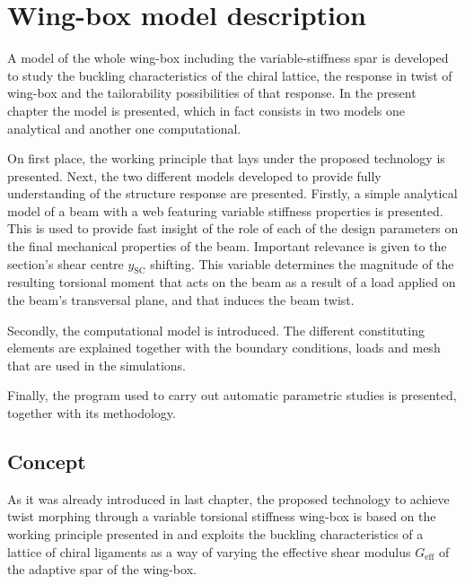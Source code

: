 \chapter{Wing-box model description} \label{chap:Model}
  
  A model of the whole wing-box including the variable-stiffness spar is developed to study the buckling characteristics of the chiral lattice, the response in twist of wing-box and the tailorability possibilities of that response. In the present chapter the model is presented, which in fact consists in two models one analytical and another one computational. 

  On first place, the working principle that lays under the proposed technology is presented. Next, the two different models developed to provide fully understanding of the structure response are presented. Firstly, a simple analytical model of a beam with a web featuring variable stiffness properties is presented. This is used to provide fast insight of the role of each of the design parameters on the final mechanical properties of the beam. Important relevance is given to the section's shear centre $y_{\mathrm{SC}}$ shifting. This variable determines the magnitude of the resulting torsional moment that acts on the beam as a result of a load applied on the beam's transversal plane, and that induces the beam twist.

  Secondly, the computational model is introduced. The different constituting elements are explained together with the boundary conditions, loads and mesh that are used in the simulations.

  Finally, the program used to carry out automatic parametric studies is presented, together with its methodology.

\section{Concept} \label{sec:concept_Model}

  As it was already introduced in last chapter, the proposed technology to achieve twist morphing through a variable torsional stiffness wing-box is based on the working principle presented in \cite{Raither2013a} and exploits the buckling characteristics of a lattice of chiral ligaments as a way of varying the effective shear modulus $G_{\mathrm{eff}}$ of the adaptive spar of the wing-box.

